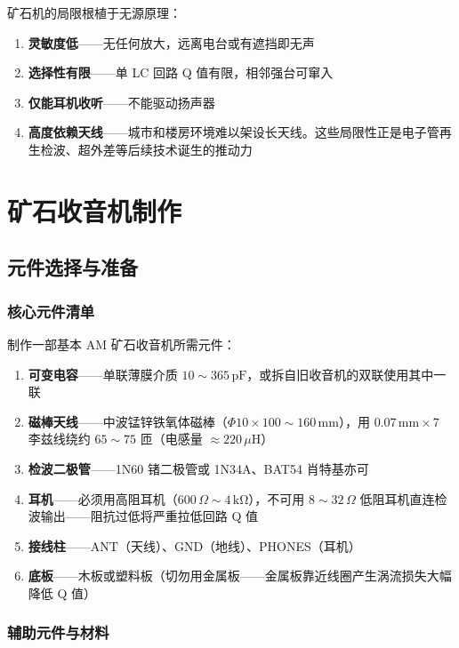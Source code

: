 \documentclass[12pt,UTF8]{ctexbook}
\begin{document}
矿石机的局限根植于无源原理：
\begin{enumerate}
\item \textbf{灵敏度低}——无任何放大，远离电台或有遮挡即无声
\item \textbf{选择性有限}——单 LC 回路 Q 值有限，相邻强台可窜入
\item \textbf{仅能耳机收听}——不能驱动扬声器
\item \textbf{高度依赖天线}——城市和楼房环境难以架设长天线。这些局限性正是电子管再生检波、超外差等后续技术诞生的推动力
\end{enumerate}


\chapter{矿石收音机制作}
\label{chap:crystal_radio_building}

\section{元件选择与准备}
\label{sec:crystal_parts}

\subsection{核心元件清单}

制作一部基本 AM 矿石收音机所需元件：
\begin{enumerate}
\item \textbf{可变电容}——单联薄膜介质 $10\sim365\,\mathrm{pF}$，或拆自旧收音机的双联使用其中一联
\item \textbf{磁棒天线}——中波锰锌铁氧体磁棒（$\Phi10\times100\sim160\,\mathrm{mm}$），用 $0.07\,\mathrm{mm}\times7$ 李兹线绕约 $65\sim75$ 匝（电感量 $\approx220\,\mu\mathrm{H}$）
\item \textbf{检波二极管}——1N60 锗二极管或 1N34A、BAT54 肖特基亦可
\item \textbf{耳机}——必须用高阻耳机（$600\,\Omega\sim4\,\mathrm{k\Omega}$），不可用 $8\sim32\,\Omega$ 低阻耳机直连检波输出——阻抗过低将严重拉低回路 Q 值
\item \textbf{接线柱}——ANT（天线）、GND（地线）、PHONES（耳机）
\item \textbf{底板}——木板或塑料板（切勿用金属板——金属板靠近线圈产生涡流损失大幅降低 Q 值）
\end{enumerate}

\subsection{辅助元件与材料}
\end{document}
